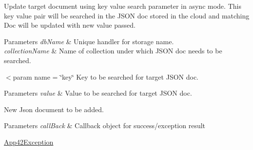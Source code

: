 Update target document using key value search parameter in async mode. This key value pair will be searched in the J\+S\+O\+N doc stored in the cloud and matching Doc will be updated with new value passed. 


\begin{DoxyParams}{Parameters}
{\em db\+Name} & Unique handler for storage name.\\
\hline
{\em collection\+Name} & Name of collection under which J\+S\+O\+N doc needs to be searched.\\
\hline
\end{DoxyParams}
$<$param name = \char`\"{}key\char`\"{} Key to be searched for target J\+S\+O\+N doc.


\begin{DoxyParams}{Parameters}
{\em value} & Value to be searched for target J\+S\+O\+N doc.\\
\hline
\end{DoxyParams}
New Json document to be added.


\begin{DoxyParams}{Parameters}
{\em call\+Back} & Callback object for success/exception result\\
\hline
\end{DoxyParams}
\hyperlink{classcom_1_1shephertz_1_1app42_1_1paas_1_1sdk_1_1csharp_1_1_app42_exception}{App42\+Exception}